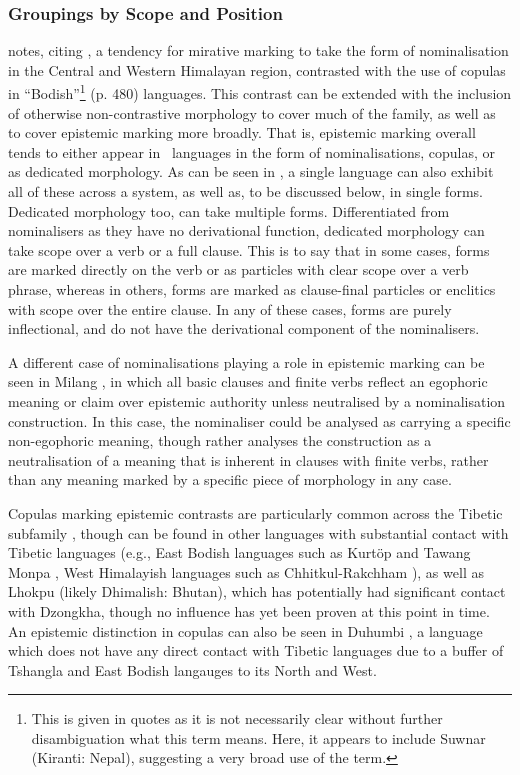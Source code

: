 \subsubsection{Groupings by Scope and Position}\label{sss:Description:ScopePosition}
 notes, citing , a tendency for mirative marking to take the form of nominalisation in the Central and Western Himalayan region, contrasted with the use of copulas in ``Bodish''\footnote{This is given in quotes as it is not necessarily clear without further disambiguation what this term means. Here, it appears to include Suwnar (Kiranti: Nepal), suggesting a very broad use of the term.} (p. 480) languages. This contrast can be extended with the inclusion of otherwise non-contrastive morphology to cover much of the family, as well as to cover epistemic marking more broadly. That is, epistemic marking overall tends to either appear in \lfam\ languages in the form of nominalisations, copulas, or as dedicated morphology. As can be seen in , a single language can also exhibit all of these across a system, as well as, to be discussed below, in single forms. Dedicated morphology too, can take multiple forms. Differentiated from nominalisers as they have no derivational function, dedicated morphology can take scope over a verb or a full clause. This is to say that in some cases, forms are marked directly on the verb or as particles with clear scope over a verb phrase, whereas in others, forms are marked as clause-final particles or enclitics with scope over the entire clause. In any of these cases, forms are purely inflectional, and do not have the derivational component of the nominalisers.

A different case of nominalisations playing a role in epistemic marking can be seen in Milang \cite[Siangic: India,][]{Modi2017}, in which all basic clauses and finite verbs reflect an egophoric meaning or claim over epistemic authority unless neutralised by a nominalisation construction. In this case, the nominaliser could be analysed as carrying a specific non-egophoric meaning, though  rather analyses the construction as a neutralisation of a meaning that is inherent in clauses with finite verbs, rather than any meaning marked by a specific piece of morphology in any case.

Copulas marking epistemic contrasts are particularly common across the Tibetic subfamily \cite{Zemp2020}, though can be found in other languages with substantial contact with Tibetic languages (e.g., East Bodish languages such as Kurtöp \cite{Hyslop2020Kurtop} and Tawang Monpa \cite{Tombleson2020}, West Himalayish languages such as Chhitkul-Rakchham \cite{Martinez2021}), as well as Lhokpu (likely Dhimalish: Bhutan), which has potentially had significant contact with Dzongkha, though no influence has yet been proven at this point in time. An epistemic distinction in copulas can also be seen in Duhumbi \cite[Duhumbi: Kho-Bwa,][]{Bodt2020}, a language which does not have any direct contact with Tibetic languages due to a buffer of Tshangla and East Bodish langauges to its North and West.

